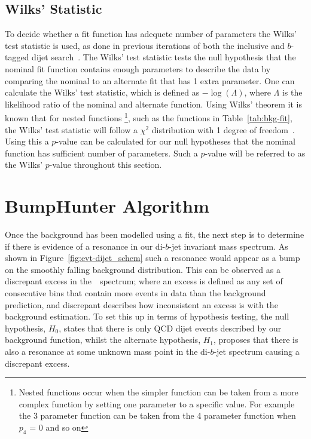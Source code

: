\subsection{Wilks' Statistic}
\label{sec:bkg-bkg_wilks}

To decide whether a fit function has adequete number of parameters the Wilks' test statistic is used,
as done in previous iterations of both the inclusive and $b$-tagged dijet search~\cite{dijet-mori16_paper,dibjet-mori16_paper}.
The Wilks' test statistic tests the null hypothesis that the nominal fit function contains enough parameters to describe the data
by comparing the nominal to an alternate fit that has 1 extra parameter.
One can calculate the Wilks' test statistic, which is defined as $-\log{(\Lambda)}$, where $\Lambda$ is the likelihood ratio of the nominal and alternate function.
Using Wilks' theorem it is known that for nested functions
\footnote{Nested functions occur when the simpler function can be taken from a more complex function by setting one parameter to a specific value.
  For example the 3 parameter function can be taken from the 4 parameter function when $p_4$ = 0 and so on},
such as the functions in Table~\ref{tab:bkg-fit},
the Wilks' test statistic will follow a $\chi^2$ distribution with 1 degree of freedom~\cite{dibjet-wilks}.
Using this a $p$-value can be calculated for our null hypotheses that the nominal function has sufficient number of parameters.
Such a $p$-value will be referred to as the Wilks' $p$-value throughout this section.


\section{BumpHunter Algorithm}
\label{sec:bkg-bh}

Once the background has been modelled using a fit, the next step is to determine
if there is evidence of a resonance in our di-$b$-jet invariant mass spectrum.
As shown in Figure~\ref{fig:evt-dijet_schem} such a resonance would appear as a bump on the smoothly falling background distribution.
This can be observed as a discrepant excess in the~\mjj~spectrum;
where an excess is defined as any set of consecutive bins that contain
more events in data than the background prediction,
and discrepant describes how inconsistent an excess is with the background estimation.
To set this up in terms of hypothesis testing, the null hypothesis, $H_0$,
states that there is only QCD dijet events described by our background function,
whilst the alternate hypothesis, $H_1$, proposes that there is also a resonance at some
unknown mass point in the di-$b$-jet spectrum causing a discrepant excess.

